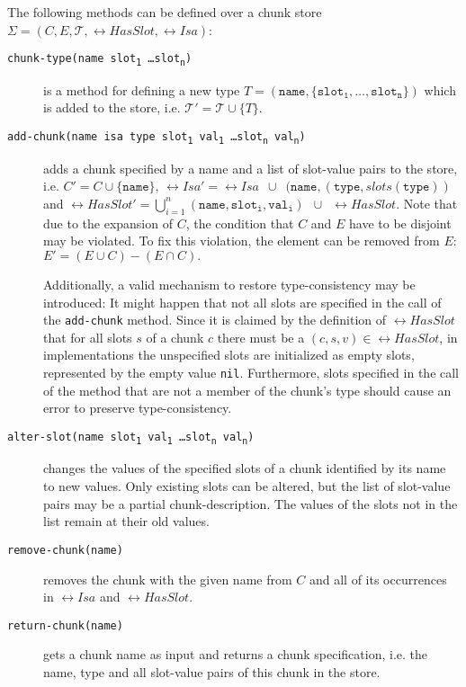 \begin{definition}
\label{def:abstract_methods_chunk_store}
The following methods can be defined over a chunk store $\Sigma = (C, E, \mathcal{T}, \rel{HasSlot}, \rel{Isa})$:

\begin{description}
 \item[\texttt{chunk-type(name slot\textsubscript{1} \dots slot\textsubscript{n})}] is a method for defining a new type $T = (\mathtt{name},\{\mathtt{slot_1}, \dots, \mathtt{slot_n}\})$ which is added to the store, i.e. $\mathcal{T'} = \mathcal{T} \cup \{T\}$. 
 \item[\texttt{add-chunk(name isa type slot\textsubscript{1} val\textsubscript{1} \dots slot\textsubscript{n} val\textsubscript{n})}] adds a chunk specified by a name and a list of slot-value pairs to the store, i.e. $C' = C \cup \{ \mathtt{name} \}$, $\rel{Isa'} = \rel{Isa} \enspace \cup \enspace (\mathtt{name}, (\mathtt{type}, slots(\mathtt{type}))$ and $\rel{HasSlot'} = \bigcup_{i = 1}^n{\mathtt{(name,slot_i,val_i)}} \enspace \cup \enspace \rel{HasSlot}.$ Note that due to the expansion of $C$, the condition that $C$ and $E$ have to be disjoint may be violated. To fix this violation, the element can be removed from $E$: $E' = (E \cup C) - (E \cap C).$ 
 
 Additionally, a valid mechanism to restore type-consistency may be introduced: It might happen that not all slots are specified in the call of the \lstinline|add-chunk| method. Since it is claimed by the definition of $\rel{HasSlot}$ that for all slots $s$ of a chunk $c$ there must be a $(c,s,v) \in \rel{HasSlot}$, in implementations the unspecified slots are initialized as empty slots, represented by the empty value \lstinline|nil|. Furthermore, slots specified in the call of the method that are not a member of the chunk's type should cause an error to preserve type-consistency.
  \item[\texttt{alter-slot(name slot\textsubscript{1} val\textsubscript{1} \dots slot\textsubscript{n} val\textsubscript{n})}] changes the values of the specified slots of a chunk identified by its name to new values. Only existing slots can be altered, but the list of slot-value pairs may be a partial chunk-description. The values of the slots not in the list remain at their old values.
  \item[\texttt{remove-chunk(name)}] removes the chunk with the given name from $C$ and all of its occurrences in $\rel{Isa}$ and $\rel{HasSlot}$.
  \item[\texttt{return-chunk(name)}] gets a chunk name as input and returns a chunk specification, i.e. the name, type and all slot-value pairs of this chunk in the store.
\end{description} 
\end{definition}

